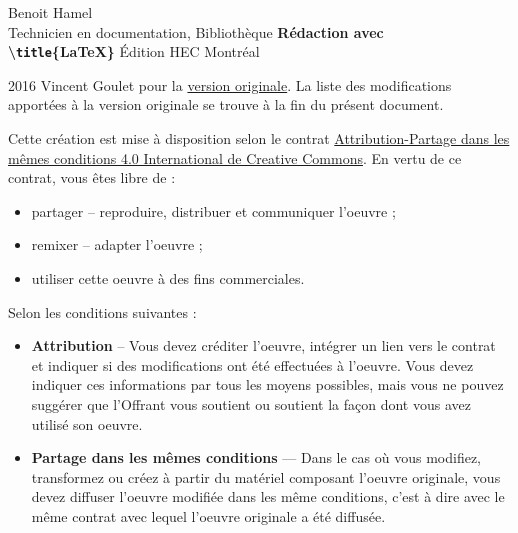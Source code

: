 \small


\begin{frame}
	
	\tiny
	Benoit Hamel \\
	Technicien en documentation, Bibliothèque
	\vfill
	{\Huge\bfseries Rédaction avec \\
	\textbackslash \texttt{title}\{\textrm{\LaTeX}\}}
	\vfill
	Édition HEC Montréal
	
\end{frame}


\begin{frame}
	
	\tiny
	{\faCopyright} 2016 Vincent Goulet pour la
	\href{https://ctan.org/pkg/formation-latex-ul}{version originale}. La liste des modifications
	apportées à la version originale se trouve à la fin du présent document.
	
	{\faCreativeCommons} Cette création est mise à disposition selon le contrat
	\href{http://creativecommons.org/licenses/by-sa/4.0/deed.fr}%
	{Attribution-Partage dans les mêmes conditions 4.0 International de Creative Commons}.
	En vertu de ce contrat, vous êtes libre de :
	
	\begin{itemize}
		\item partager -- reproduire, distribuer et communiquer l’oeuvre ;
		\item remixer -- adapter l’oeuvre ;
		\item utiliser cette oeuvre à des fins commerciales.
	\end{itemize}

	Selon les conditions suivantes :
	
	\begin{itemize}
		
		\item \textbf{Attribution} -- Vous devez créditer l’oeuvre, intégrer un lien vers le contrat et indiquer si des modifications ont été effectuées	à l’oeuvre. Vous devez indiquer ces informations par tous les moyens possibles, mais vous ne pouvez suggérer que l’Offrant vous soutient ou soutient la façon dont vous avez utilisé son oeuvre.
		
		\item \textbf{Partage dans les mêmes conditions} — Dans le cas où vous modifiez, transformez ou créez à partir du matériel composant l’oeuvre originale, vous devez diffuser l’oeuvre modifiée dans les même conditions, c’est à dire avec le même contrat avec	lequel l’oeuvre originale a été diffusée.
		
	\end{itemize}

\end{frame}

